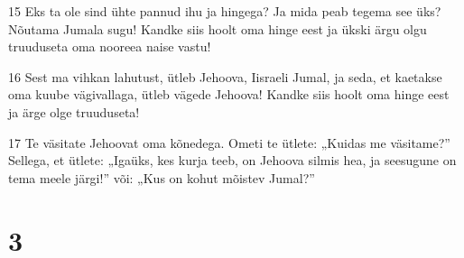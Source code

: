 \par 15 Eks ta ole sind ühte pannud ihu ja hingega? Ja mida peab tegema see üks? Nõutama Jumala sugu! Kandke siis hoolt oma hinge eest ja ükski ärgu olgu truuduseta oma nooreea naise vastu!
\par 16 Sest ma vihkan lahutust, ütleb Jehoova, Iisraeli Jumal, ja seda, et kaetakse oma kuube vägivallaga, ütleb vägede Jehoova! Kandke siis hoolt oma hinge eest ja ärge olge truuduseta!
\par 17 Te väsitate Jehoovat oma kõnedega. Ometi te ütlete: „Kuidas me väsitame?” Sellega, et ütlete: „Igaüks, kes kurja teeb, on Jehoova silmis hea, ja seesugune on tema meele järgi!” või: „Kus on kohut mõistev Jumal?”


\chapter{3}


